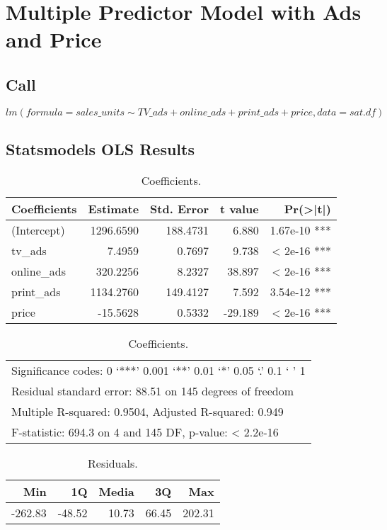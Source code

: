 \section{Multiple Predictor Model with Ads and Price}
\subsection{Call}
\[
	lm(formula = sales\_units \sim TV\_ads + online\_ads + print\_ads + price, data = sat.df)
\]
\subsection{Statsmodels OLS Results}
\begin{table}[htb!]
\centering
\begin{tabular}{lrrrr}
	\toprule
	Coefficients & Estimate & Std. Error & t value & Pr(>|t|) \\
	\midrule
	(Intercept) & 1296.6590 & 188.4731 & 6.880 & 1.67e-10 *** \\
	tv\_ads & 7.4959 & 0.7697 & 9.738 & < 2e-16 *** \\
	online\_ads & 320.2256 & 8.2327 & 38.897 & < 2e-16 *** \\
	print\_ads & 1134.2760 & 149.4127 & 7.592 & 3.54e-12 *** \\
	price & -15.5628 & 0.5332 & -29.189 & < 2e-16 *** \\
	\bottomrule
\end{tabular}
\begin{tabular}{l}
Significance codes:  0 ‘***’ 0.001 ‘**’ 0.01 ‘*’ 0.05 ‘.’ 0.1 ‘ ’ 1 \\
Residual standard error: 88.51 on 145 degrees of freedom \\
Multiple R-squared:  0.9504, Adjusted R-squared:  0.949 \\
F-statistic: 694.3 on 4 and 145 DF, p-value: < 2.2e-16 \\
\end{tabular}
\caption{\label{tab:table-name}Coefficients.}
\end{table}
\begin{table}[htb!]
\centering
\begin{tabular}{rrrrr}
	\toprule
	Min & 1Q & Media & 3Q & Max \\
	\midrule
	-262.83 & -48.52 & 10.73 & 66.45 & 202.31 \\
	\bottomrule
\end{tabular}
\caption{\label{tab:table-name}Residuals.}
\end{table}
\pagebreak
